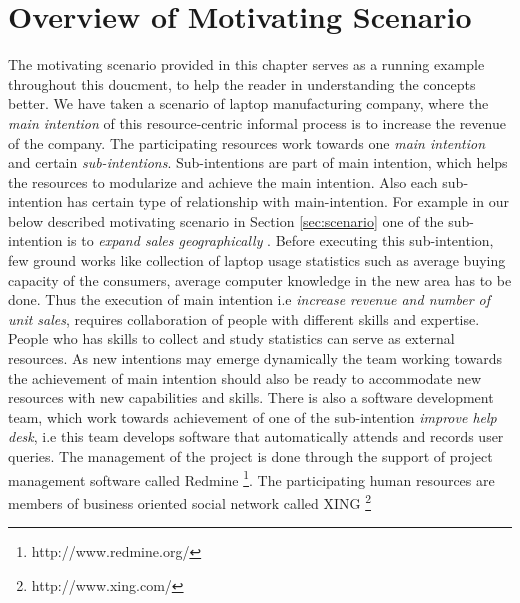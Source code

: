 \section{Overview of Motivating Scenario}
\label{sec:overview}
The motivating scenario provided in this chapter serves as a running example throughout this doucment, to help the reader in understanding the concepts better. We have taken a scenario of laptop manufacturing company, where the \textit{main intention} of this resource-centric informal process is to increase the revenue of the company. The participating resources work towards one \textit{main intention} and certain \textit{sub-intentions}. Sub-intentions are part of main intention, which helps the resources to modularize and achieve the main intention. Also each sub-intention has certain type of relationship with main-intention. For example in our below described motivating scenario in Section \ref{sec:scenario} one of the sub-intention is to \textit{expand sales geographically} . Before executing this sub-intention, few ground works like collection of laptop usage statistics such as average buying capacity of the consumers, average computer knowledge in the new area has to be done. Thus the execution of main intention i.e \textit{increase revenue and number of unit sales}, requires collaboration of people with different skills and expertise. People who has skills to collect and study statistics can serve as external resources. As new intentions may emerge dynamically the team working towards the achievement of main intention should also be ready to accommodate new resources with new capabilities and skills. There is also a software development team, which work towards achievement of one of the sub-intention \textit{improve help desk}, i.e this team develops software that automatically attends and records user queries.  The management of the project is done through the support of project management software called Redmine \footnote{http://www.redmine.org/}. The participating human resources are members of business oriented social network called XING \footnote{http://www.xing.com/}
 





